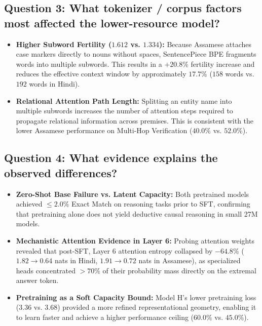 \documentclass[11pt,a4paper]{article}
\begin{document}
\subsection{Question 3: What tokenizer / corpus factors most affected the lower-resource model?}
\begin{itemize}[noitemsep]
    \item \textbf{Higher Subword Fertility ($1.612$ vs. $1.334$):} Because Assamese attaches case markers directly to nouns without spaces, SentencePiece BPE fragments words into multiple subwords. This results in a $+20.8\%$ fertility increase and reduces the effective context window by approximately $17.7\%$ ($158$ words vs. $192$ words in Hindi).

    \item \textbf{Relational Attention Path Length:} Splitting an entity name into multiple subwords increases the number of attention steps required to propagate relational information across premises. This is consistent with the lower Assamese performance on Multi-Hop Verification ($40.0\%$ vs. $52.0\%$).
\end{itemize}

\subsection{Question 4: What evidence explains the observed differences?}
\begin{itemize}[noitemsep]
    \item \textbf{Zero-Shot Base Failure vs. Latent Capacity:} Both pretrained models achieved $\le 2.0\%$ Exact Match on reasoning tasks prior to SFT, confirming that pretraining alone does not yield deductive causal reasoning in small 27M models.
    \item \textbf{Mechanistic Attention Evidence in Layer 6:} Probing attention weights revealed that post-SFT, Layer 6 attention entropy collapsed by \textbf{$-64.8\%$} ($1.82 \to 0.64$ nats in Hindi, $1.91 \to 0.72$ nats in Assamese), as specialized heads concentrated $>70\%$ of their probability mass directly on the extremal answer token.
    \item \textbf{Pretraining as a Soft Capacity Bound:} Model H's lower pretraining loss ($3.36$ vs. $3.68$) provided a more refined representational geometry, enabling it to learn faster and achieve a higher performance ceiling ($60.0\%$ vs. $45.0\%$).
\end{itemize}

\end{document}
